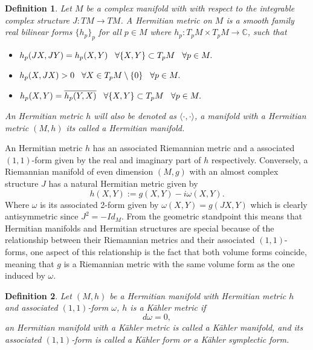 \documentclass[12pt,twoside,a4paper]{report}
\newtheorem{definition}{Definition}[section]
\newcommand{\co}{\ensuremath{\mathbb C }}
\begin{document}
\begin{definition}
        Let $M$ be a complex manifold with with respect to the integrable complex structure $J:TM\rightarrow TM$. A \textit{Hermitian metric} on $M$ is a smooth family real bilinear forms $\lbrace h_p\rbrace_p$ for all $p\in M$ where $h_p:T_pM\times T_pM\rightarrow\co$, such that
\begin{itemize}
        \item $h_p(JX,JY)=h_p(X,Y)\hspace{0.3cm}\forall\lbrace X,Y\rbrace\subset T_pM\hspace{0.3cm}\forall p\in M.$
        \item $h_p(X,JX)>0\hspace{0.3cm}\forall X\in T_p M\setminus\lbrace 0\rbrace\hspace{0.3cm}\forall p\in M.$
        \item $h_p(X,Y)=\overline{h_p(Y,X)}\hspace{0.3cm}\forall\lbrace X,Y\rbrace\subset T_pM\hspace{0.3cm}\forall p\in M.$
\end{itemize}
An Hermitian metric $h$ will also be denoted as $\langle\cdot,\cdot\rangle$, a manifold with a Hermitian metric $(M,h)$ its called a \textit{Hermitian manifold}.
\end{definition}
An Hermitian metric $h$ has an associated Riemannian metric and a associated $(1,1)$-form given by the real and imaginary part of $h$ respectively. Conversely, a Riemannian manifold of even dimension $(M,g)$ with an almost complex structure $J$ has a natural Hermitian metric given by
\[
  h(X,Y):=g(X,Y)-i\omega(X,Y).
\]
\noindent Where $\omega$ is its associated 2-form given by $\omega(X,Y)=g(JX,Y)$ which is clearly antisymmetric since $J^2=-Id_M$. From the geometric standpoint this means that Hermitian manifolds and Hermitian structures are special because of the relationship between their Riemannian metrics and their associated $(1,1)$-forms, one aspect of this relationship is the fact that both volume forms coincide, meaning that $g$ is a Riemannian metric with the same volume form as the one induced by $\omega$.

\begin{definition}\label{Kahler-metric}
        Let $(M,h)$ be a Hermitian manifold with Hermitian metric $h$ and associated $(1,1)$-form $\omega$, $h$ is a Kähler metric if
        \[
          d\omega=0,
        \]
        \noindent an Hermitian manifold with a Kähler metric is called a \textit{Kähler manifold}, and its associated $(1,1)$-form is  called a \textit{Kähler form} or a \textit{Kähler symplectic form}.
\end{definition}
\end{document}
